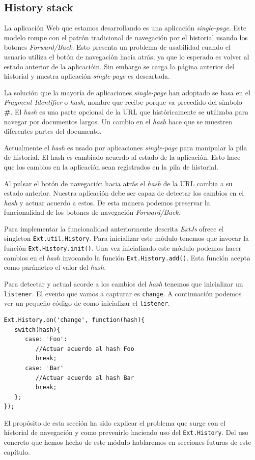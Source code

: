 	\subsection{History stack}
		La aplicación Web que estamos desarrollando es una aplicación \emph{single-page}. Este modelo rompe con el patrón tradicional de
		navegación por el historial usando los botones \emph{Forward/Back}. Esto presenta un problema de usabilidad cuando el usuario utiliza
		el botón de navegación hacia atrás, ya que lo esperado es volver al estado anterior de la aplicacióin. Sin embargo se carga la
		página anterior del historial y nuestra aplicación \emph{single-page} es descartada.
		\par
		La solución que la mayoría de aplicaciones \emph{single-page} han adoptado se basa en el \emph{Fragment Identifier}  o \emph{hash},
		nombre que recibe porque va precedido del símbolo \textbf{\#}. El \emph{hash} es una parte opcional de la URL que históricamente se
		utilizaba para navegar por documentos largos. Un cambio en el \emph{hash} hace que se muestren diferentes partes del documento.
		\par
		Actualmente el \emph{hash} es usado por aplicaciones \emph{single-page} para manipular la pila de historial. El hash es cambiado
		acuerdo al estado de la aplicación. Esto hace que los cambios en la aplicación sean registrados en la pila de historial.
		\par
		Al pulsar el botón de navegación hacia atrás el \emph{hash} de la URL cambia a su estado anterior. Nuestra aplicación debe ser capaz
		de detectar los cambios en el \emph{hash} y actuar acuerdo a estos. De esta manera podemos preservar la funcionalidad de los botones
		de navegación \emph{Forward/Back}. 
		\par
		Para implementar la funcionalidad anteriormente descrita \emph{ExtJs} ofrece el singleton \texttt{Ext.util.History}. Para inicializar este
		módulo tenemos que invocar la función \texttt{Ext.History.init()}. Una vez inicializado este módulo podemos hacer cambios en el
		\emph{hash} invocando la función \texttt{Ext.History.add()}. Esta función acepta como parámetro el valor del \emph{hash}. 
		\par
		Para detectar y actual acorde a los cambios del \emph{hash} tenemos que inicializar un \texttt{listener}. El evento que vamos a
		capturar es \texttt{change}. A continuación podemos ver un pequeño código de como inicializar el \texttt{listener}.
		\begin{lstlisting}[style=myJs]
Ext.History.on('change', function(hash){
   switch(hash){
      case: 'Foo':
         //Actuar acuerdo al hash Foo
         break;
      case: 'Bar'
         //Actuar acuerdo al hash Bar
         break;
   };
});
		\end{lstlisting}
		\par
		El propósito de esta sección ha sido explicar el problema que surge con el historial de navegación y como prevenirlo haciendo uso del
		\texttt{Ext.History}. Del uso concreto que hemos hecho de este módulo hablaremos en secciones futuras de este capítulo.

